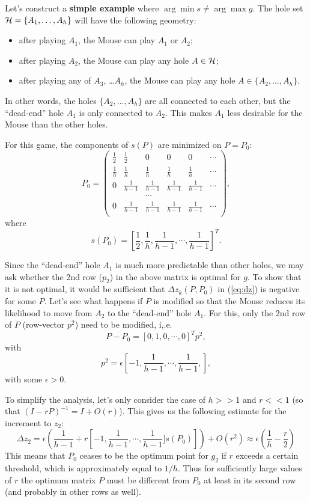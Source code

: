 \documentclass[12pt]{article}
\begin{document}
Let's construct a {\bf simple example} where  $\arg\min s \ne \arg\max g$.  The hole set ${\cal{H}}=\{ A_1, \ldots, A_h \}$  will have the following geometry:
\begin{itemize}
\item after playing $A_1$, the Mouse can play $A_1$ or $A_2$;
\item after playing $A_2$, the Mouse can play any hole $A\in\cal{H}$;
\item after playing any of $A_3$, \dots $A_h$, the Mouse can play any hole $A\in\{A_2, \ldots, A_h\}$.
\end{itemize}
In other words, the  holes  $\{A_2, \ldots, A_h\}$ are all connected to each other, but the ``dead-end'' hole $A_1$ is only connected to $A_2$. This makes $A_1$ less desirable for the Mouse than the other holes.

For this game, the components of $s(P)$ are minimized on $P=P_0$:
$$
P_0 = \begin{pmatrix}
\frac{1}{2} & \frac{1}{2} &  0  & 0 & 0 & \cdots  \\
\frac{1}{h} & \frac{1}{h} & \frac{1}{h} & \frac{1}{h}  & \frac{1}{h}& \cdots \\
0  & \frac{1}{h-1} & \frac{1}{h-1} & \frac{1}{h-1} & \frac{1}{h-1} & \cdots \\
   &     & \cdots &  &  & \\
0  & \frac{1}{h-1} & \frac{1}{h-1} & \frac{1}{h-1} & \frac{1}{h-1} & \cdots \\
\end{pmatrix},
$$
where 
$$
s(P_0) = \left[ \frac{1}{2}, \frac{1}{h}, \frac{1}{h-1}, \cdots, \frac{1}{h-1}\right]^T.
$$

Since the ``dead-end'' hole $A_1$ is much more predictable than other holes, we may ask whether the 2nd row ($p_2$) in the above matrix is optimal for $g$. To show that it is not optimal, it would be sufficient that $\Delta z_k(P,P_0)$ in (\ref{eq:dz}) is negative for some $P$. Let's see what happens if $P$ is
modified so that the Mouse reduces its likelihood to move from $A_2$ to the ``dead-end'' hole $A_1$. For this, only the 2nd row of $P$ (row-vector $p^2$) need to be modified, i,.e.
$$
P-P_0 = [0, 1, 0, \cdots, 0]^T p^2,
$$
with 
$$
p^2 = \epsilon \left[-1,  \frac{1}{h-1}, \cdots, \frac{1}{h-1}, \right],
$$
with some $\epsilon>0$.

To simplify the analysis, let's only consider the case of $h>>1$ and $r<<1$
(so that $(I-rP)^{-1} = I + O(r)$). This gives us the following estimate for the increment to $z_2$:
$$
\Delta z_2 = \epsilon \left( 
\frac{1}{h-1} + 
r \left[-1,  \frac{1}{h-1}, \cdots, \frac{1}{h-1}]  s(P_0) \right] 
\right) + O(r^2)
 \approx \epsilon \left( \frac{1}{h} -  \frac{r}{2} \right)
$$
This means that $P_0$ ceases to be the optimum point for $g_2$ if $r$ exceeds a certain threshold, which is approximately equal to $1/h$. Thus for sufficiently large values of $r$ the optimum matrix $P$ must be different from $P_0$ at least in its second row (and probably in other rows as well).
\end{document}
